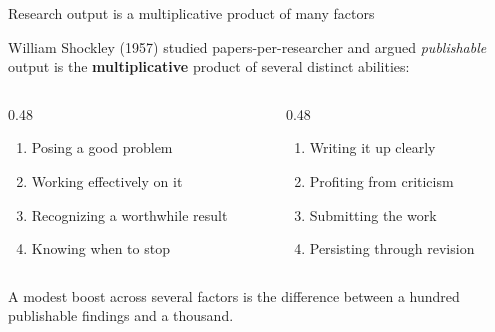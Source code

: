 \documentclass[aspectratio=169,12pt,t]{beamer}
\begin{document}
\begin{frame}{Research output is a multiplicative product of many factors}
\vspace{0.15cm}

William Shockley (1957) studied papers-per-researcher and argued \textit{publishable} output is the \textbf{multiplicative} product of several distinct abilities:

\begin{columns}[T]
\begin{column}{0.48\textwidth}
\begin{enumerate}\scriptsize\setlength\itemsep{0pt}
  \item Posing a good problem
  \item Working effectively on it
  \item Recognizing a worthwhile result
  \item Knowing when to stop
\end{enumerate}
\end{column}
\begin{column}{0.48\textwidth}
\begin{enumerate}\scriptsize\setlength\itemsep{0pt}\setcounter{enumi}{4}
  \item Writing it up clearly
  \item Profiting from criticism
  \item Submitting the work
  \item Persisting through revision
\end{enumerate}
\end{column}
\end{columns}

\vspace{0.3cm}
 \;A modest boost across several factors is the difference between a hundred publishable findings and a thousand.

\vspace{0.2em}
\end{frame}
\end{document}
